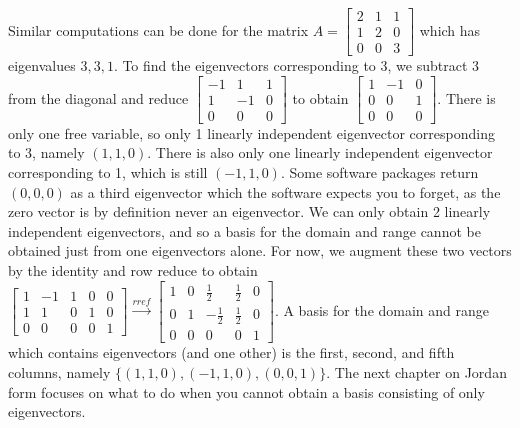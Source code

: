 \begin{example}
Similar computations can be done for the matrix
$A=
\begin{bmatrix}
 2 & 1 & 1 \\
 1 & 2 & 0 \\
 0 & 0 & 3
\end{bmatrix}
$ which has eigenvalues $3,3,1$. To find the eigenvectors corresponding to 3, we subtract 3 from the diagonal and reduce 
$
\begin{bmatrix}
 -1 & 1 & 1 \\
 1 & -1 & 0 \\
 0 & 0 & 0
\end{bmatrix}
$
to obtain
$
\begin{bmatrix}
 1 & -1 & 0 \\
 0 & 0 & 1\\
 0 & 0 & 0
\end{bmatrix}
$. 
There is only one free variable, so only 1 linearly independent eigenvector corresponding to 3, namely $(1,1,0)$. There is also only one linearly independent eigenvector corresponding to 1, which is still $(-1,1,0)$. 
Some software packages return $(0,0,0)$ as a third eigenvector which the software expects you to forget, as the zero vector is by definition never an eigenvector. 
We can only obtain 2 linearly independent eigenvectors, and so a basis for the domain and range cannot be obtained just from one eigenvectors alone. For now, we augment these two vectors by the identity and row reduce to obtain 
$
\begin{bmatrix}
 1 & -1 & 1 & 0 & 0 \\
 1 & 1 & 0 & 1 & 0 \\
 0 & 0 & 0 & 0 & 1
\end{bmatrix}
\xrightarrow{rref}
\begin{bmatrix}
 1 & 0 & \frac{1}{2} & \frac{1}{2} & 0 \\
 0 & 1 & -\frac{1}{2} & \frac{1}{2} & 0 \\
 0 & 0 & 0 & 0 & 1
\end{bmatrix}
$. A basis for the domain and range which contains eigenvectors (and one other) is the first, second, and fifth columns, namely $\{ (1,1,0), (-1,1,0), (0,0,1) \}$.  The next chapter on Jordan form focuses on what to do when you cannot obtain a basis consisting of only eigenvectors. 
\end{example}









